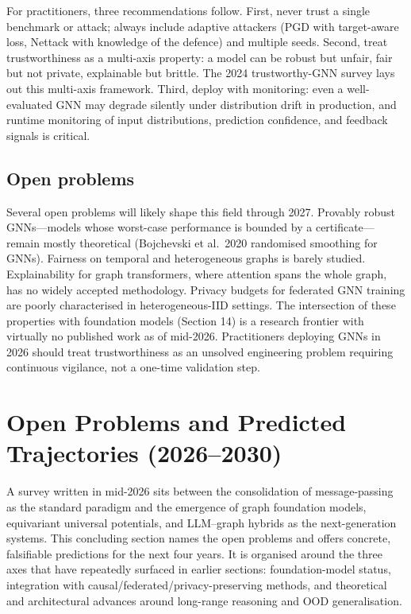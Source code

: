 \documentclass{article}
\begin{document}
For practitioners, three recommendations follow. First, never trust a single benchmark or attack; always include adaptive attackers (PGD with target-aware loss, Nettack with knowledge of the defence) and multiple seeds. Second, treat trustworthiness as a multi-axis property: a model can be robust but unfair, fair but not private, explainable but brittle. The 2024 trustworthy-GNN survey lays out this multi-axis framework. Third, deploy with monitoring: even a well-evaluated GNN may degrade silently under distribution drift in production, and runtime monitoring of input distributions, prediction confidence, and feedback signals is critical.

\subsection{Open problems}\label{open-problems}

Several open problems will likely shape this field through 2027. Provably robust GNNs---models whose worst-case performance is bounded by a certificate---remain mostly theoretical (Bojchevski et al.~2020 randomised smoothing for GNNs). Fairness on temporal and heterogeneous graphs is barely studied. Explainability for graph transformers, where attention spans the whole graph, has no widely accepted methodology. Privacy budgets for federated GNN training are poorly characterised in heterogeneous-IID settings. The intersection of these properties with foundation models (Section 14) is a research frontier with virtually no published work as of mid-2026. Practitioners deploying GNNs in 2026 should treat trustworthiness as an unsolved engineering problem requiring continuous vigilance, not a one-time validation step.
\section{Open Problems and Predicted Trajectories (2026--2030)}\label{sec:open-problems-and-predicted-trajectories-2026-2030}
A survey written in mid-2026 sits between the consolidation of message-passing as the standard paradigm and the emergence of graph foundation models, equivariant universal potentials, and LLM--graph hybrids as the next-generation systems. This concluding section names the open problems and offers concrete, falsifiable predictions for the next four years. It is organised around the three axes that have repeatedly surfaced in earlier sections: foundation-model status, integration with causal/federated/privacy-preserving methods, and theoretical and architectural advances around long-range reasoning and OOD generalisation.
\end{document}
